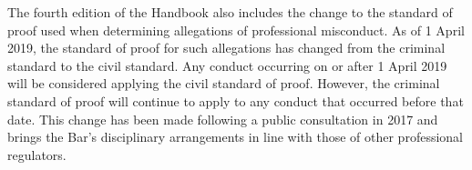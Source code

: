 The fourth edition of the Handbook also includes the change to the standard of proof used when determining allegations of professional misconduct.  As of 1 April 2019, the standard of proof for such allegations has changed from the criminal standard to the civil standard.  Any conduct occurring on or after 1 April 2019 will be considered applying the civil standard of proof. However, the criminal standard of proof will continue to apply to any conduct that occurred before that date. This change has been made following a public consultation in 2017 and brings the Bar's disciplinary arrangements in line with those of other professional regulators.

